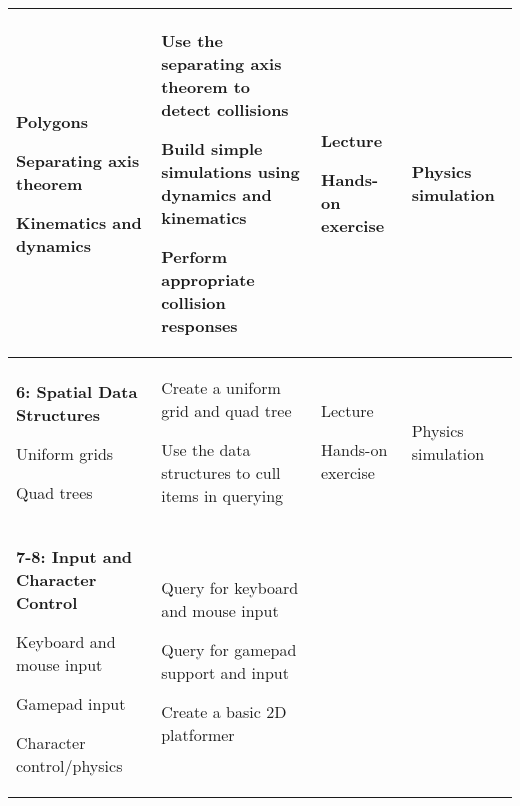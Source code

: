 \documentclass[10pt]{article}
\newenvironment{itemize*}{
\begin{itemize}[leftmargin=1em,noitemsep,nolistsep]
}{\end{itemize}}
\begin{document}
\begin{longtable}{||p{1.8in}|p{2.4in}|p{1.3in}|p{1in}||}
\begin{itemize*}
		\item Polygons
		\item Separating axis theorem
		\item Kinematics and dynamics
	\end{itemize*} &
	\begin{itemize*}
		\item Use the separating axis theorem to detect collisions
		\item Build simple simulations using dynamics and kinematics
		\item Perform appropriate collision responses
	\end{itemize*} &
	\begin{itemize*}
		\item Lecture
		\item Hands-on exercise
	\end{itemize*} & Physics simulation \\ \hline
\textbf{6: Spatial Data Structures} 
	\begin{itemize*}
		\item Uniform grids
		\item Quad trees
	\end{itemize*} &
	\begin{itemize*}
		\item Create a uniform grid and quad tree
		\item Use the data structures to cull items in querying
	\end{itemize*} &
	\begin{itemize*}
		\item Lecture
		\item Hands-on exercise
	\end{itemize*} & Physics simulation \\ \hline
\textbf{7-8: Input and Character Control} 
	\begin{itemize*}
		\item Keyboard and mouse input
		\item Gamepad input
		\item Character control/physics
	\end{itemize*} &
	\begin{itemize*}
		\item Query for keyboard and mouse input
		\item Query for gamepad support and input
		\item Create a basic 2D platformer
	\end{itemize*} & 
	\begin{itemize*}

\end{itemize*}
\end{longtable}
\end{document}
